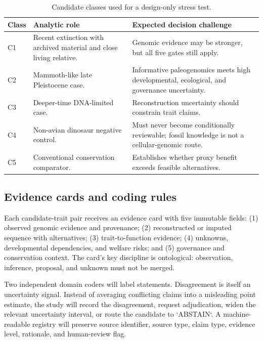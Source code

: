 \documentclass[conference]{IEEEtran}
\begin{document}
\begin{table}[t]
\caption{Candidate classes used for a design-only stress test.}
\label{tab:classes}
\centering
\footnotesize
\setlength{\tabcolsep}{2.5pt}
\begin{tabular}{p{} p{} p{}}
\toprule
\textbf{Class} & \textbf{Analytic role} & \textbf{Expected decision challenge} \\
\midrule
C1 & Recent extinction with archived material and close living relative. & Genomic evidence may be stronger, but all five gates still apply. \\
C2 & Mammoth-like late Pleistocene case. & Informative paleogenomics meets high developmental, ecological, and governance uncertainty. \\
C3 & Deeper-time DNA-limited case. & Reconstruction uncertainty should constrain trait claims. \\
C4 & Non-avian dinosaur negative control. & Must never become conditionally reviewable; fossil knowledge is not a cellular-genomic route. \\
C5 & Conventional conservation comparator. & Establishes whether proxy benefit exceeds feasible alternatives. \\
\bottomrule
\end{tabular}
\end{table}

\subsection{Evidence cards and coding rules}

Each candidate-trait pair receives an evidence card with five immutable fields: (1) observed genomic evidence and provenance; (2) reconstructed or imputed sequence with alternatives; (3) trait-to-function evidence; (4) unknowns, developmental dependencies, and welfare risks; and (5) governance and conservation context. The card's key discipline is ontological: observation, inference, proposal, and unknown must not be merged.

Two independent domain coders will label statements. Disagreement is itself an uncertainty signal. Instead of averaging conflicting claims into a misleading point estimate, the study will record the disagreement, request adjudication, widen the relevant uncertainty interval, or route the candidate to `ABSTAIN`. A machine-readable registry will preserve source identifier, source type, claim type, evidence level, rationale, and human-review flag.
\end{document}
